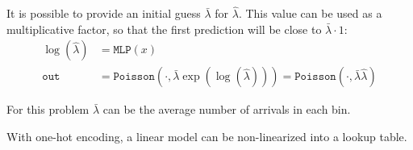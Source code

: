 \begin{description}
\begin{description}
\begin{descriptionlist}
                        It is possible to provide an initial guess $\bar{\lambda}$ for $\hat{\lambda}$. This value can be used as a multiplicative factor, so that the first prediction will be close to $\bar{\lambda} \cdot 1$:
                        \[
                            \begin{split}
                                \log(\hat{\lambda}) &= \texttt{MLP}(x) \\
                                \texttt{out} &= \texttt{Poisson}\left( \cdot, \bar{\lambda}\exp\left(\log(\hat{\lambda})\right) \right) = \texttt{Poisson}(\cdot, \bar{\lambda}\hat{\lambda})
                            \end{split}
                        \]

                        \begin{remark}
                            For this problem $\bar{\lambda}$ can be the average number of arrivals in each bin.
                        \end{remark}
                \end{descriptionlist}
        \end{description}

        \begin{remark}
            With one-hot encoding, a linear model can be non-linearized into a lookup table.

            \indenttbox
            \begin{example}
                \phantom{}


\end{example}
\end{remark}
\end{description}

